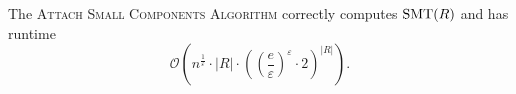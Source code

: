 \documentclass[../skript.tex]{subfiles}
\begin{document}
\vspace{-7pt}
\begin{algorithm}[H]
\end{algorithm}
\vspace{-7pt}
\EndAlgorithmLine
\begin{theorem} %
\label{thm:68}
The \textsc{Attach Small Components Algorithm} correctly computes $\operatorname{SMT}(R)$ and has runtime
\[
\mathcal{O} \left( n^\frac{1}{\varepsilon} \cdot |R| \cdot \left( \left( \frac{e}{\varepsilon} \right)^\varepsilon \cdot 2  \right)^{|R|} \right).
\]
\end{theorem}
\end{document}
